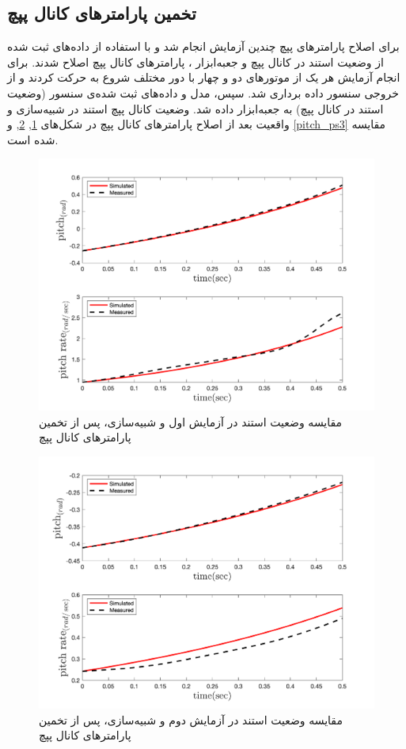 \subsection{تخمین پارامترهای کانال پپچ}
برای اصلاح پارامترهای پپچ چندین آزمایش انجام شد و با استفاده از داده‌های ثبت شده از وضعیت استند در کانال پپچ و جعبه‌ابزار
،
پارامترهای کانال پپچ اصلاح شدند.
برای انجام آزمایش هر یک از موتورهای دو و چهار  با دور مختلف شروع به حرکت کردند و از خروجی سنسور داده برداری شد. سپس، مدل و داده‌های ثبت شده‌ی سنسور (وضعیت استند در کانال پپچ) به جعبه‌ابزار
داده شد. وضعیت کانال پپچ استند در شبیه‌سازی و واقعیت بعد از اصلاح پارامترهای کانال پپچ در شکل‌های
\ref{pitch_ps1}, \ref{pitch_ps2}, و \ref{pitch_ps3}
مقایسه شده است.

\begin{figure}[H]
	\includegraphics[width=12cm]{../../Figures/RCP/pitch_parameter_estimation/RCP_pitch_S1.png}
	\centering
	\caption{مقايسه وضعیت استند در  آزمايش اول و شبیه‌سازی، پس از تخمین پارامترهای کانال پپچ}
	\label{pitch_ps1}
\end{figure}
\begin{figure}[H]
	\includegraphics[width=12cm]{../../Figures/RCP/pitch_parameter_estimation/RCP_pitch_S2.png}
	\centering
	\caption{مقايسه وضعیت استند در  آزمايش دوم و شبیه‌سازی، پس از تخمین پارامترهای کانال پپچ}
	\label{pitch_ps2}
\end{figure}
